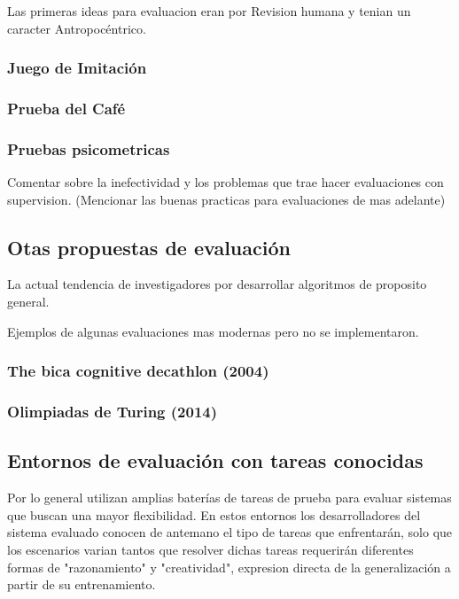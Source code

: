 Las primeras ideas para evaluacion eran por Revision humana y tenian un caracter Antropocéntrico.

\subsubsection{Juego de Imitación}

\subsubsection{Prueba del Café}

\subsubsection{Pruebas psicometricas}

Comentar sobre la inefectividad y los problemas que trae hacer evaluaciones con supervision. (Mencionar las buenas practicas para evaluaciones de mas adelante)

\subsection{Otas propuestas de evaluación}

La actual tendencia de investigadores por desarrollar algoritmos de proposito general.  

Ejemplos de algunas evaluaciones mas modernas pero no se implementaron.

\subsubsection{The bica cognitive decathlon (2004)}

\subsubsection{Olimpiadas de Turing (2014)}


\subsection{Entornos de evaluación con tareas conocidas}\label{section:state-of-the-art:inteligence-evaluation-enviroments:evaluation-enviroments-with-know-tasks}

Por lo general utilizan amplias baterías de tareas de prueba para evaluar sistemas que buscan una mayor flexibilidad. En estos entornos los desarrolladores del sistema evaluado conocen de antemano el tipo de tareas que enfrentarán, solo que los escenarios varian tantos que resolver dichas tareas requerirán diferentes formas de "razonamiento" y "creatividad", expresion directa de la generalización a partir de su entrenamiento.

